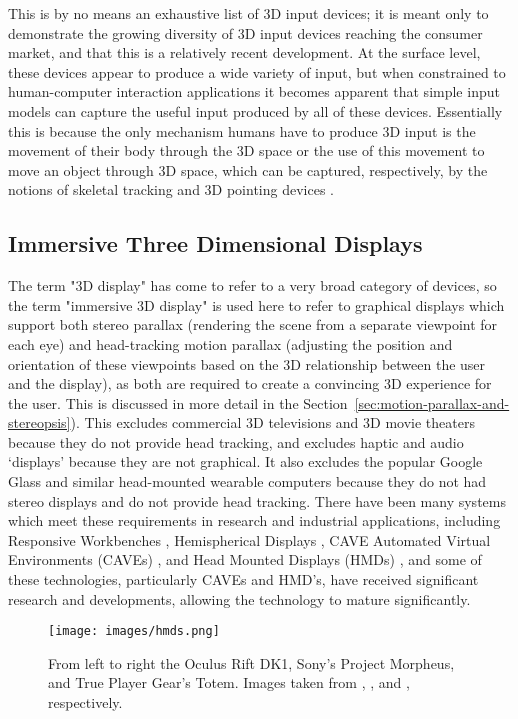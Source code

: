 This is by no means an exhaustive list of 3D input devices; it is meant only to demonstrate the growing diversity of 3D input devices reaching the consumer market, and that this is a relatively recent development. At the surface level, these devices appear to produce a wide variety of input, but when constrained to human-computer interaction applications it becomes apparent that simple input models can capture the useful input produced by all of these devices. Essentially this is because the only mechanism humans have to produce 3D input is the movement of their body through the 3D space or the use of this movement to move an object through 3D space, which can be captured, respectively, by the notions of skeletal tracking and 3D pointing devices \cite{jester}.

\subsection{Immersive Three Dimensional Displays}
\label{sec:3d-display}
	
	The term "3D display" has come to refer to a very broad category of devices, so the term "immersive 3D display" is used here to refer to graphical displays which support both stereo parallax (rendering the scene from a separate viewpoint for each eye) and head-tracking motion parallax (adjusting the position and orientation of these viewpoints based on the 3D relationship between the user and the display), as both are required to create a convincing 3D experience for the user. This is discussed in more detail in the Section~\ref{sec:motion-parallax-and-stereopsis}). This excludes commercial 3D televisions and 3D movie theaters because they do not provide head tracking, and excludes haptic and audio `displays' because they are not graphical. It also excludes the popular Google Glass and similar head-mounted wearable computers because they do not had stereo displays and do not provide head tracking. There have been many systems which meet these requirements in research and industrial applications, including Responsive Workbenches \cite{responsive-workbench}, Hemispherical Displays \cite{hemi-display}, CAVE Automated Virtual Environments (CAVEs) \cite{cave}, and Head Mounted Displays (HMDs) \cite{sutherland-hmd}, and some of these technologies, particularly CAVEs and HMD's, have received significant research and developments, allowing the technology to mature significantly.
	
\begin{figure}[ht!]
\centering
\texttt{[image: images/hmds.png]}
\caption{From left to right the Oculus Rift DK1, Sony's Project Morpheus, and True Player Gear's Totem. Images taken from \protect\cite{oculus-rift}, \protect\cite{project-morpheus}, and \protect\cite{true-player-gear}, respectively.}
\label{fig:hmds}
\end{figure}
 
